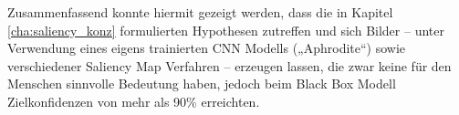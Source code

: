 Zusammenfassend konnte hiermit gezeigt werden, dass die in Kapitel \ref{cha:saliency_konz} formulierten Hypothesen zutreffen und sich Bilder – unter Verwendung eines eigens trainierten \ac{CNN} Modells („Aphrodite“) sowie verschiedener Saliency Map Verfahren – erzeugen lassen, die zwar keine für den Menschen sinnvolle Bedeutung haben, jedoch beim Black Box Modell Zielkonfidenzen von mehr als 90\% erreichten.


